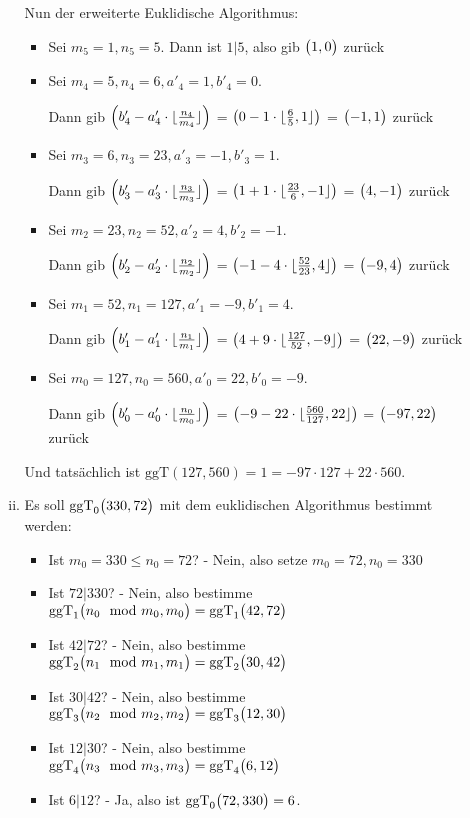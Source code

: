 \documentclass{scrreprt}
\newcommand{\ggT}[0]{\text{ggT}}
\DeclarePairedDelimiter{\floor}{\lfloor}{\rfloor}
\begin{document}
\begin{enumerate}[(a)]
\begin{enumerate}[(i)]
    Nun der erweiterte Euklidische Algorithmus:
    \begin{itemize}
    \item Sei $m_5 = 1, n_5 = 5$.
      Dann ist $1|5$, also gib $\qty\big(1, 0)$ zurück
    \item Sei $m_4 = 5, n_4 = 6, a'_4 = 1, b'_4 = 0$.

      Dann gib $\qty(b'_4 - a'_4 \cdot \floor{\frac{n_4}{m_4}})$ =
      $\qty(0 - 1 \cdot \floor{\frac{6}{5}, 1})$ =
      $\qty\big(-1, 1)$ zurück
    \item Sei $m_3 = 6, n_3 = 23, a'_3 = -1, b'_3 = 1$.

      Dann gib $\qty(b'_3 - a'_3 \cdot \floor{\frac{n_3}{m_3}})$ =
      $\qty(1 + 1 \cdot \floor{\frac{23}{6}, -1})$ =
      $\qty\big(4, -1)$ zurück
    \item Sei $m_2 = 23, n_2 = 52, a'_2 = 4, b'_2 = -1$.

      Dann gib $\qty(b'_2 - a'_2 \cdot \floor{\frac{n_2}{m_2}})$ =
      $\qty(-1 - 4 \cdot \floor{\frac{52}{23}, 4})$ =
      $\qty\big(-9, 4)$ zurück
    \item Sei $m_1 = 52, n_1 = 127, a'_1 = -9, b'_1 = 4$.

      Dann gib $\qty(b'_1 - a'_1 \cdot \floor{\frac{n_1}{m_1}})$ =
      $\qty(4 + 9 \cdot \floor{\frac{127}{52}, -9})$ =
      $\qty\big(22, -9)$ zurück
    \item Sei $m_0 = 127, n_0 = 560, a'_0 = 22, b'_0 = -9$.

      Dann gib $\qty(b'_0 - a'_0 \cdot \floor{\frac{n_0}{m_0}})$ =
      $\qty(-9 - 22 \cdot \floor{\frac{560}{127}, 22})$ =
      $\qty\big(-97, 22)$ zurück
    \end{itemize}
    Und tatsächlich ist $\ggT(127, 560) = 1 = -97 \cdot 127 + 22 \cdot 560$.

  \newpage
  \item Es soll $\ggT_0\qty\big(330, 72)$ mit dem euklidischen Algorithmus
    bestimmt werden:
    \begin{itemize}
    \item Ist $m_0 = 330 \leq n_0 = 72$? - Nein, also setze $m_0 = 72, n_0 = 330$
    \item Ist $72|330$? - Nein, also bestimme
      $\ggT_1\qty\big(n_0 \mod m_0, m_0) = \ggT_1\qty\big(42, 72)$
    \item Ist $42|72$? - Nein, also bestimme
      $\ggT_2\qty\big(n_1 \mod m_1, m_1) = \ggT_2\qty\big(30, 42)$
    \item Ist $30|42$? - Nein, also bestimme
      $\ggT_3\qty\big(n_2 \mod m_2, m_2) = \ggT_3\qty\big(12, 30)$
    \item Ist $12|30$? - Nein, also bestimme
      $\ggT_4\qty\big(n_3 \mod m_3, m_3) = \ggT_4\qty\big(6, 12)$
    \item Ist $6|12$? - Ja, also ist $\ggT_0\qty\big(72, 330) = 6$.
    \end{itemize}


\end{enumerate}
\end{enumerate}
\end{document}
